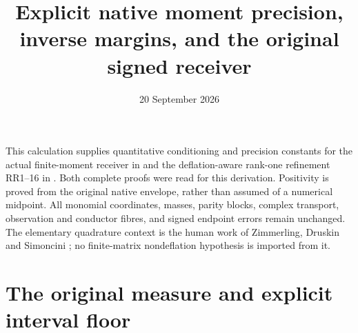 \documentclass[11pt]{article}
\title{Explicit native moment precision, inverse margins, and the original signed receiver}
\author{}
\date{20 September 2026}
\begin{document}
\maketitle

This calculation supplies quantitative conditioning and precision
constants for the actual finite-moment receiver in \cite{FM} and the
deflation-aware rank-one refinement RR1--16 in \cite{RR}. Both complete
proofs were read for this derivation. Positivity is proved from the
original native envelope, rather than assumed of a numerical midpoint.
All monomial coordinates, masses, parity blocks, complex transport,
observation and conductor fibres, and signed endpoint errors remain
unchanged. The elementary quadrature context is the human work of
Zimmerling, Druskin and Simoncini \cite{ZDS}; no finite-matrix
nondeflation hypothesis is imported from it.

\section{The original measure and explicit interval floor}
\end{document}

